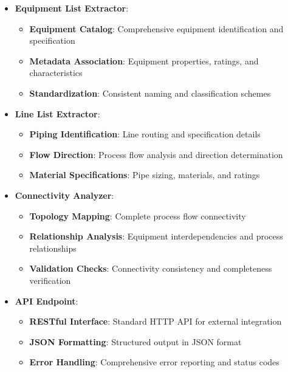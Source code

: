 \documentclass[12pt]{report}
\begin{document}
\begin{itemize}
  \item \textbf{Equipment List Extractor}:
    \begin{itemize}
      \item \textbf{Equipment Catalog}: Comprehensive equipment identification and specification
      \item \textbf{Metadata Association}: Equipment properties, ratings, and characteristics
      \item \textbf{Standardization}: Consistent naming and classification schemes
    \end{itemize}
  \item \textbf{Line List Extractor}:
    \begin{itemize}
      \item \textbf{Piping Identification}: Line routing and specification details
      \item \textbf{Flow Direction}: Process flow analysis and direction determination
      \item \textbf{Material Specifications}: Pipe sizing, materials, and ratings
    \end{itemize}
  \item \textbf{Connectivity Analyzer}:
    \begin{itemize}
      \item \textbf{Topology Mapping}: Complete process flow connectivity
      \item \textbf{Relationship Analysis}: Equipment interdependencies and process relationships
      \item \textbf{Validation Checks}: Connectivity consistency and completeness verification
    \end{itemize}
  \item \textbf{API Endpoint}:
    \begin{itemize}
      \item \textbf{RESTful Interface}: Standard HTTP API for external integration
      \item \textbf{JSON Formatting}: Structured output in JSON format
      \item \textbf{Error Handling}: Comprehensive error reporting and status codes
    \end{itemize}
\end{itemize}
\end{document}
